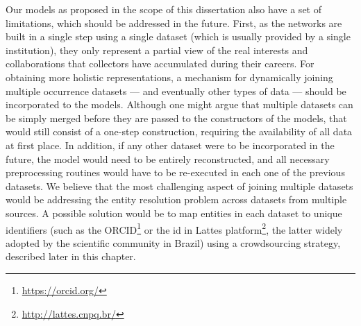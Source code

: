 
Our models as proposed in the scope of this dissertation also have a set of limitations, which should be addressed in the future.
First, as the networks are built in a single step using a single dataset (which is usually provided by a single institution), they only represent a partial view of the real interests and collaborations that collectors have accumulated during their careers.
For obtaining more holistic representations, a mechanism for dynamically joining multiple occurrence datasets --- and eventually other types of data --- should be incorporated to the models.
Although one might argue that multiple datasets can be simply merged before they are passed to the constructors of the models, that would still consist of a one-step construction, requiring the availability of all data at first place.
In addition, if any other dataset were to be incorporated in the future, the model would need to be entirely reconstructed, and all necessary preprocessing routines would have to be re-executed in each one of the previous datasets.
%
We believe that the most challenging aspect of joining multiple datasets would be addressing the entity resolution problem across datasets from multiple sources. A possible solution would be to map entities in each dataset to unique identifiers (such as the ORCID\footnote{\url{https://orcid.org/}} or the id in Lattes platform\footnote{\url{http://lattes.cnpq.br/}}, the latter widely adopted by the scientific community in Brazil) using a crowdsourcing strategy, described later in this chapter.

